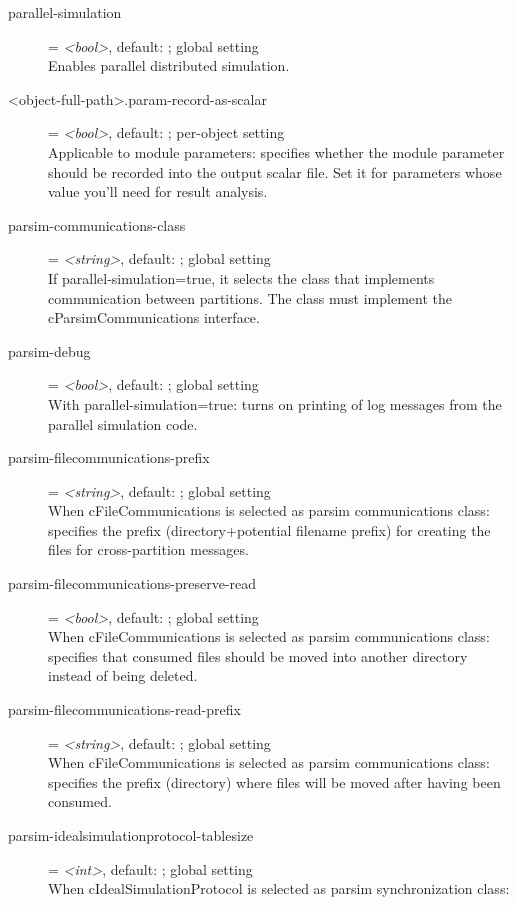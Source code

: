 \begin{description}
\item[parallel-simulation] = \textit{<bool>}, default: ; global setting \\
    Enables parallel distributed simulation.
\item[<object-full-path>.param-record-as-scalar] = \textit{<bool>}, default: ; per-object setting \\
    Applicable to module parameters: specifies whether the module parameter
    should be recorded into the output scalar file. Set it for parameters whose
    value you'll need for result analysis.
\item[parsim-communications-class] = \textit{<string>}, default: ; global setting \\
    If parallel-simulation=true, it selects the class that implements
    communication between partitions. The class must implement the
    cParsimCommunications interface.
\item[parsim-debug] = \textit{<bool>}, default: ; global setting \\
    With parallel-simulation=true: turns on printing of log messages from the
    parallel simulation code.
\item[parsim-filecommunications-prefix] = \textit{<string>}, default: ; global setting \\
    When cFileCommunications is selected as parsim communications class:
    specifies the prefix (directory+potential filename prefix) for creating the
    files for cross-partition messages.
\item[parsim-filecommunications-preserve-read] = \textit{<bool>}, default: ; global setting \\
    When cFileCommunications is selected as parsim communications class:
    specifies that consumed files should be moved into another directory
    instead of being deleted.
\item[parsim-filecommunications-read-prefix] = \textit{<string>}, default: ; global setting \\
    When cFileCommunications is selected as parsim communications class:
    specifies the prefix (directory) where files will be moved after having
    been consumed.
\item[parsim-idealsimulationprotocol-tablesize] = \textit{<int>}, default: ; global setting \\
    When cIdealSimulationProtocol is selected as parsim synchronization class:

\end{description}
